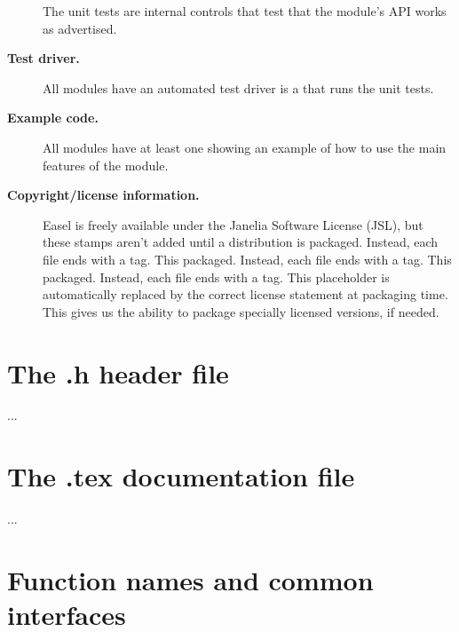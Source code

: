\begin{description}
  The unit tests are internal controls that test that the module's API
  works as advertised.

\item [\textbf{Test driver.}]

  All modules have an automated test driver is a  that
  runs the unit tests.
 
\item [\textbf{Example code.}]

  All modules have at least one  showing an example of
  how to use the main features of the module.

\item [\textbf{Copyright/license information.}]

  Easel is freely available under the Janelia Software License (JSL),
  but these stamps aren't added until a distribution is
  packaged. Instead, each file ends with a  tag. This
  packaged. Instead, each file ends with a  tag. This
  packaged. Instead, each file ends with a  tag. This
  placeholder is automatically replaced by the correct license
  statement at packaging time. This gives us the ability to package
  specially licensed versions, if needed.

\end{description}


\section{The .h header file}

...

\section{The .tex documentation file}

...


\section{Function names and common interfaces}

